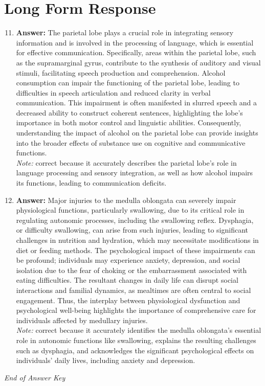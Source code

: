 \documentclass[12pt]{article}
\begin{document}
\section*{Long Form Response}
\begin{enumerate}[label=\arabic*.]
\setcounter{enumi}{10}
\item \textbf{Answer:} The parietal lobe plays a crucial role in integrating sensory information and is involved in the processing of language, which is essential for effective communication. Specifically, areas within the parietal lobe, such as the supramarginal gyrus, contribute to the synthesis of auditory and visual stimuli, facilitating speech production and comprehension. Alcohol consumption can impair the functioning of the parietal lobe, leading to difficulties in speech articulation and reduced clarity in verbal communication. This impairment is often manifested in slurred speech and a decreased ability to construct coherent sentences, highlighting the lobe's importance in both motor control and linguistic abilities. Consequently, understanding the impact of alcohol on the parietal lobe can provide insights into the broader effects of substance use on cognitive and communicative functions.
\\ \textit{Note:} correct because it accurately describes the parietal lobe's role in language processing and sensory integration, as well as how alcohol impairs its functions, leading to communication deficits.
\item \textbf{Answer:} Major injuries to the medulla oblongata can severely impair physiological functions, particularly swallowing, due to its critical role in regulating autonomic processes, including the swallowing reflex. Dysphagia, or difficulty swallowing, can arise from such injuries, leading to significant challenges in nutrition and hydration, which may necessitate modifications in diet or feeding methods. The psychological impact of these impairments can be profound; individuals may experience anxiety, depression, and social isolation due to the fear of choking or the embarrassment associated with eating difficulties. The resultant changes in daily life can disrupt social interactions and familial dynamics, as mealtimes are often central to social engagement. Thus, the interplay between physiological dysfunction and psychological well-being highlights the importance of comprehensive care for individuals affected by medullary injuries.
\\ \textit{Note:} correct because it accurately identifies the medulla oblongata's essential role in autonomic functions like swallowing, explains the resulting challenges such as dysphagia, and acknowledges the significant psychological effects on individuals' daily lives, including anxiety and depression.
\end{enumerate}

\vfill
\noindent\textit{End of Answer Key}
\end{document}
